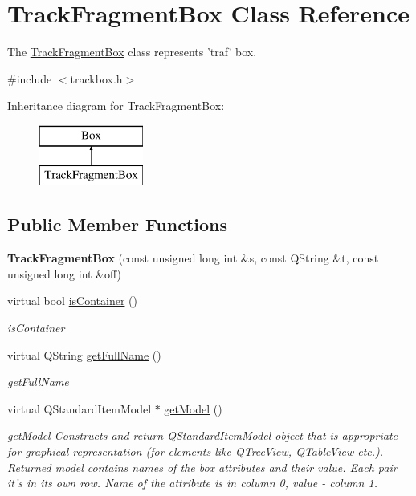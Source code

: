 \hypertarget{class_track_fragment_box}{\section{Track\-Fragment\-Box Class Reference}
\label{class_track_fragment_box}
}


The \hyperlink{class_track_fragment_box}{Track\-Fragment\-Box} class represents 'traf' box.  




{\ttfamily \#include $<$trackbox.\-h$>$}

Inheritance diagram for Track\-Fragment\-Box\-:\begin{figure}[H]
\begin{center}
\leavevmode
\includegraphics[height=2.000000cm]{class_track_fragment_box}
\end{center}
\end{figure}
\subsection*{Public Member Functions}
\begin{DoxyCompactItemize}
\item 
\hypertarget{class_track_fragment_box_a684d6dbfc5c9bb2d14c1991c1a199fab}{{\bfseries Track\-Fragment\-Box} (const unsigned long int \&s, const Q\-String \&t, const unsigned long int \&off)}\label{class_track_fragment_box_a684d6dbfc5c9bb2d14c1991c1a199fab}

\item 
virtual bool \hyperlink{class_track_fragment_box_a49538cd7fe1c888203eab7cee5cfb08c}{is\-Container} ()
\begin{DoxyCompactList}\small\item\em is\-Container \end{DoxyCompactList}\item 
virtual Q\-String \hyperlink{class_track_fragment_box_a1ab269642f375777c20b9ab52fbc72f7}{get\-Full\-Name} ()
\begin{DoxyCompactList}\small\item\em get\-Full\-Name \end{DoxyCompactList}\item 
virtual Q\-Standard\-Item\-Model $\ast$ \hyperlink{class_track_fragment_box_a0a177d42598a374f5d187a3f968aeb01}{get\-Model} ()
\begin{DoxyCompactList}\small\item\em get\-Model Constructs and return Q\-Standard\-Item\-Model object that is appropriate for graphical representation (for elements like Q\-Tree\-View, Q\-Table\-View etc.). Returned model contains names of the box attributes and their value. Each pair it's in its own row. Name of the attribute is in column 0, value -\/ column 1. \end{DoxyCompactList}\end{DoxyCompactItemize}
